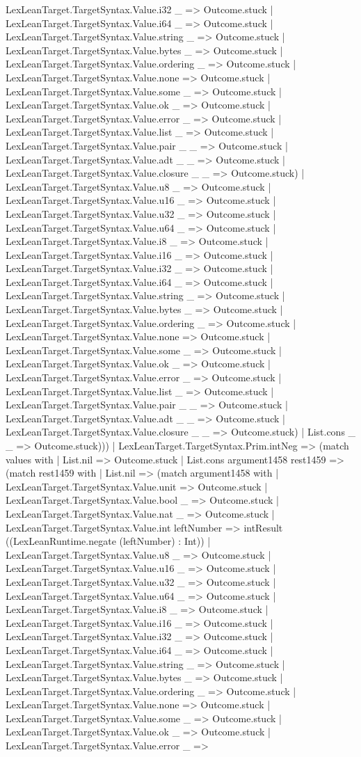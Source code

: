 \documentclass[11pt]{article}
\begin{document}
LexLeanTarget.TargetSyntax.Value.i32 \_ => Outcome.stuck | LexLeanTarget.TargetSyntax.Value.i64 \_ => Outcome.stuck | LexLeanTarget.TargetSyntax.Value.string \_ => Outcome.stuck | LexLeanTarget.TargetSyntax.Value.bytes \_ => Outcome.stuck | LexLeanTarget.TargetSyntax.Value.ordering \_ => Outcome.stuck | LexLeanTarget.TargetSyntax.Value.none => Outcome.stuck | LexLeanTarget.TargetSyntax.Value.some \_ => Outcome.stuck | LexLeanTarget.TargetSyntax.Value.ok \_ => Outcome.stuck | LexLeanTarget.TargetSyntax.Value.error \_ => Outcome.stuck | LexLeanTarget.TargetSyntax.Value.list \_ => Outcome.stuck | LexLeanTarget.TargetSyntax.Value.pair \_ \_ => Outcome.stuck | LexLeanTarget.TargetSyntax.Value.adt \_ \_ => Outcome.stuck | LexLeanTarget.TargetSyntax.Value.closure \_ \_ => Outcome.stuck) | LexLeanTarget.TargetSyntax.Value.u8 \_ => Outcome.stuck | LexLeanTarget.TargetSyntax.Value.u16 \_ => Outcome.stuck | LexLeanTarget.TargetSyntax.Value.u32 \_ => Outcome.stuck | LexLeanTarget.TargetSyntax.Value.u64 \_ => Outcome.stuck | LexLeanTarget.TargetSyntax.Value.i8 \_ => Outcome.stuck | LexLeanTarget.TargetSyntax.Value.i16 \_ => Outcome.stuck | LexLeanTarget.TargetSyntax.Value.i32 \_ => Outcome.stuck | LexLeanTarget.TargetSyntax.Value.i64 \_ => Outcome.stuck | LexLeanTarget.TargetSyntax.Value.string \_ => Outcome.stuck | LexLeanTarget.TargetSyntax.Value.bytes \_ => Outcome.stuck | LexLeanTarget.TargetSyntax.Value.ordering \_ => Outcome.stuck | LexLeanTarget.TargetSyntax.Value.none => Outcome.stuck | LexLeanTarget.TargetSyntax.Value.some \_ => Outcome.stuck | LexLeanTarget.TargetSyntax.Value.ok \_ => Outcome.stuck | LexLeanTarget.TargetSyntax.Value.error \_ => Outcome.stuck | LexLeanTarget.TargetSyntax.Value.list \_ => Outcome.stuck | LexLeanTarget.TargetSyntax.Value.pair \_ \_ => Outcome.stuck | LexLeanTarget.TargetSyntax.Value.adt \_ \_ => Outcome.stuck | LexLeanTarget.TargetSyntax.Value.closure \_ \_ => Outcome.stuck) | List.cons \_ \_ => Outcome.stuck))) | LexLeanTarget.TargetSyntax.Prim.intNeg => (match values with | List.nil => Outcome.stuck | List.cons argument1458 rest1459 => (match rest1459 with | List.nil => (match argument1458 with | LexLeanTarget.TargetSyntax.Value.unit => Outcome.stuck | LexLeanTarget.TargetSyntax.Value.bool \_ => Outcome.stuck | LexLeanTarget.TargetSyntax.Value.nat \_ => Outcome.stuck | LexLeanTarget.TargetSyntax.Value.int leftNumber => intResult ((LexLeanRuntime.negate (leftNumber) : Int)) | LexLeanTarget.TargetSyntax.Value.u8 \_ => Outcome.stuck | LexLeanTarget.TargetSyntax.Value.u16 \_ => Outcome.stuck | LexLeanTarget.TargetSyntax.Value.u32 \_ => Outcome.stuck | LexLeanTarget.TargetSyntax.Value.u64 \_ => Outcome.stuck | LexLeanTarget.TargetSyntax.Value.i8 \_ => Outcome.stuck | LexLeanTarget.TargetSyntax.Value.i16 \_ => Outcome.stuck | LexLeanTarget.TargetSyntax.Value.i32 \_ => Outcome.stuck | LexLeanTarget.TargetSyntax.Value.i64 \_ => Outcome.stuck | LexLeanTarget.TargetSyntax.Value.string \_ => Outcome.stuck | LexLeanTarget.TargetSyntax.Value.bytes \_ => Outcome.stuck | LexLeanTarget.TargetSyntax.Value.ordering \_ => Outcome.stuck | LexLeanTarget.TargetSyntax.Value.none => Outcome.stuck | LexLeanTarget.TargetSyntax.Value.some \_ => Outcome.stuck | LexLeanTarget.TargetSyntax.Value.ok \_ => Outcome.stuck | LexLeanTarget.TargetSyntax.Value.error \_ => 
\end{document}
